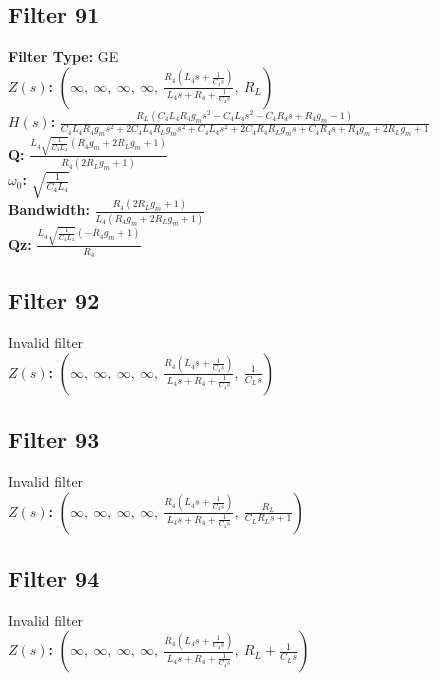 \documentclass{article}
\begin{document}
\subsection*{Filter 91}
\textbf{Filter Type:} GE \\ 
\textbf{$Z(s)$:} $\left( \infty, \  \infty, \  \infty, \  \infty, \  \frac{R_{4} \left(L_{4} s + \frac{1}{C_{4} s}\right)}{L_{4} s + R_{4} + \frac{1}{C_{4} s}}, \  R_{L}\right)$ \\ 
\textbf{$H(s)$:} $\frac{R_{L} \left(C_{4} L_{4} R_{4} g_{m} s^{2} - C_{4} L_{4} s^{2} - C_{4} R_{4} s + R_{4} g_{m} - 1\right)}{C_{4} L_{4} R_{4} g_{m} s^{2} + 2 C_{4} L_{4} R_{L} g_{m} s^{2} + C_{4} L_{4} s^{2} + 2 C_{4} R_{4} R_{L} g_{m} s + C_{4} R_{4} s + R_{4} g_{m} + 2 R_{L} g_{m} + 1}$ \\ 
\textbf{Q:} $\frac{L_{4} \sqrt{\frac{1}{C_{4} L_{4}}} \left(R_{4} g_{m} + 2 R_{L} g_{m} + 1\right)}{R_{4} \left(2 R_{L} g_{m} + 1\right)}$ \\ 
\textbf{$\omega_0$:} $\sqrt{\frac{1}{C_{4} L_{4}}}$ \\ 
\textbf{Bandwidth:} $\frac{R_{4} \left(2 R_{L} g_{m} + 1\right)}{L_{4} \left(R_{4} g_{m} + 2 R_{L} g_{m} + 1\right)}$ \\ 
\textbf{Qz:} $\frac{L_{4} \sqrt{\frac{1}{C_{4} L_{4}}} \left(- R_{4} g_{m} + 1\right)}{R_{4}}$ \\ 
\subsection*{Filter 92}
Invalid filter \\ 
\textbf{$Z(s)$:} $\left( \infty, \  \infty, \  \infty, \  \infty, \  \frac{R_{4} \left(L_{4} s + \frac{1}{C_{4} s}\right)}{L_{4} s + R_{4} + \frac{1}{C_{4} s}}, \  \frac{1}{C_{L} s}\right)$ \\ 
\subsection*{Filter 93}
Invalid filter \\ 
\textbf{$Z(s)$:} $\left( \infty, \  \infty, \  \infty, \  \infty, \  \frac{R_{4} \left(L_{4} s + \frac{1}{C_{4} s}\right)}{L_{4} s + R_{4} + \frac{1}{C_{4} s}}, \  \frac{R_{L}}{C_{L} R_{L} s + 1}\right)$ \\ 
\subsection*{Filter 94}
Invalid filter \\ 
\textbf{$Z(s)$:} $\left( \infty, \  \infty, \  \infty, \  \infty, \  \frac{R_{4} \left(L_{4} s + \frac{1}{C_{4} s}\right)}{L_{4} s + R_{4} + \frac{1}{C_{4} s}}, \  R_{L} + \frac{1}{C_{L} s}\right)$ \\ 
\end{document}

